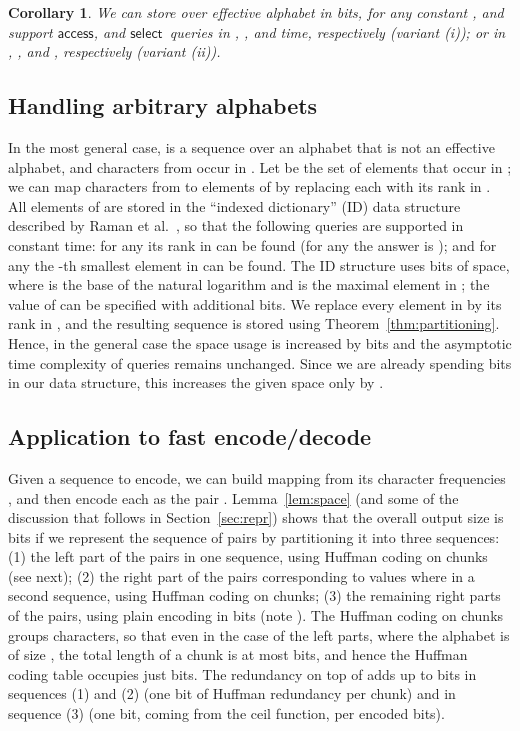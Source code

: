 \documentclass[11pt]{article}
\newtheorem{corollary}[theorem]{Corollary}
\newcommand{\access}
    {\ensuremath{\mathsf{access}}}
\newcommand{\select}
    {\ensuremath{\mathsf{select}}}
\begin{document}
\begin{table}[t]
{\begin{tabular}
\begin{corollary} \label{cor:partitioning-constant}
We can store  over effective alphabet  in
 bits, for any constant , and 
support \access,  and \select\ queries in
, , and  time,
respectively (variant (i)); or in , , and , respectively (variant
(ii)).
\end{corollary}

\subsection{Handling arbitrary alphabets} \label{sec:effective}

In the most general case,  is a sequence over an alphabet 
that is not an effective alphabet, and  characters from 
occur in .
Let  be the set of elements that occur in ; we can map
characters from  to elements of  by replacing
each  with its rank in .
All elements of  are stored in the ``indexed dictionary'' (ID) data
structure described by Raman et al.~\cite{RRR02}, so that the
following queries are supported in constant time:
for any  its rank in  can be found (for any
 the answer is );
and for any  the -th smallest element in 
can be found. The ID structure uses
 bits
of space, where
 is the base of the natural logarithm and
 is the maximal element in ;
the value of  can be specified with additional
 bits.
We replace every element in  by its rank in , and the
resulting sequence is stored using Theorem~\ref{thm:partitioning}.
Hence, in the general case the space usage is increased by
 bits and
the asymptotic time complexity of queries remains unchanged.
Since we are already spending  bits in our data
structure, this increases the given space only by 
.

\subsection{Application to fast encode/decode}

Given a sequence  to encode, we can build mapping  from its
character frequencies , and then encode each  as the pair
. 
Lemma~\ref{lem:space} (and some of the discussion that 
follows in Section~\ref{sec:repr}) shows that the overall output size is
 bits if we represent the sequence of pairs 
by partitioning it into three sequences: (1) the left part of the pairs in one 
sequence, using Huffman coding on chunks (see next); (2) the right part of the 
pairs corresponding to values where  in a second sequence, 
using Huffman coding on chunks; (3) the remaining right parts of the pairs, 
using plain encoding in  bits (note 
). The Huffman coding on chunks groups
 characters, so that even in the case of the left 
parts, where the alphabet is of size , the total length 
of a chunk is at most  bits, and hence the Huffman coding
table occupies just  bits. 
The redundancy on top of  adds up to  
bits in sequences (1) and (2) (one bit
of Huffman redundancy per chunk) and  in sequence (3) 
(one bit, coming from the ceil function, per 
encoded bits).


\end{tabular}}
\end{table}
\end{document}
